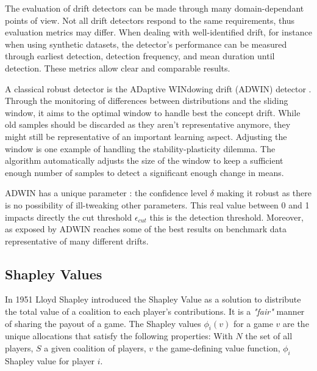 \documentclass[runningheads]{llncs}
\begin{document}
    The evaluation of drift detectors can be made through many domain-dependant points of view. Not all drift detectors respond to the same requirements, thus evaluation metrics may differ.
    When dealing with well-identified drift, for instance when using synthetic datasets, the detector's performance can be measured through earliest detection, detection frequency, and mean duration until detection. These metrics allow clear and comparable results.
    
    
    A classical robust detector is the ADaptive WINdowing drift (ADWIN) detector \cite{bifet_learning_2007}. Through the monitoring of differences between distributions and the sliding window, it aims to the optimal window to handle best the concept drift. While old samples should be discarded as they aren't representative anymore, they might still be representative of an important learning aspect. Adjusting the window is one example of handling the stability-plasticity dilemma.
    The algorithm automatically adjusts the size of the window to keep a sufficient enough number of samples to detect a significant enough change in means. 
    
    ADWIN has a unique parameter \cite{gomes_adaptive_2017}: the confidence level $\delta$ making it robust as there is no possibility of ill-tweaking other parameters. This real value between 0 and 1 impacts directly the cut threshold $\epsilon_{cut}$ this is the detection threshold. Moreover, as exposed by \cite{souza_challenges_2020} ADWIN reaches some of the best results on benchmark data representative of many different drifts.

\subsection{Shapley Values}
    In 1951 Lloyd Shapley introduced the Shapley Value as a solution to distribute the total value of a coalition to each player's contributions. It is a \emph{"fair"} manner of sharing the payout of a game. 
    The Shapley values $\phi_i(v)$ for a game $v$ are the unique allocations that satisfy the following properties: With $N$ the set of all players, $S$ a given coalition of players, $v$ the game-defining value function, $\phi_i$ Shapley value for player $i$.
    
\end{document}
